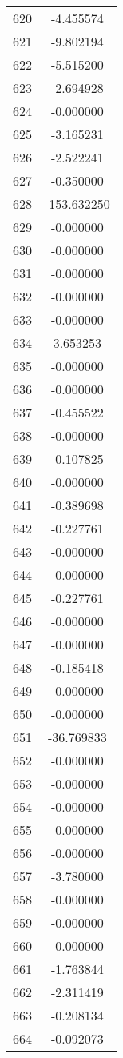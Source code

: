 \documentclass[12pt]{article}
\begin{document}
\begin{longtable}{@{}cc@{}}
620 & -4.455574 \\
621 & -9.802194 \\
622 & -5.515200 \\
623 & -2.694928 \\
624 & -0.000000 \\
625 & -3.165231 \\
626 & -2.522241 \\
627 & -0.350000 \\
628 & -153.632250 \\
629 & -0.000000 \\
630 & -0.000000 \\
631 & -0.000000 \\
632 & -0.000000 \\
633 & -0.000000 \\
634 & 3.653253 \\
635 & -0.000000 \\
636 & -0.000000 \\
637 & -0.455522 \\
638 & -0.000000 \\
639 & -0.107825 \\
640 & -0.000000 \\
641 & -0.389698 \\
642 & -0.227761 \\
643 & -0.000000 \\
644 & -0.000000 \\
645 & -0.227761 \\
646 & -0.000000 \\
647 & -0.000000 \\
648 & -0.185418 \\
649 & -0.000000 \\
650 & -0.000000 \\
651 & -36.769833 \\
652 & -0.000000 \\
653 & -0.000000 \\
654 & -0.000000 \\
655 & -0.000000 \\
656 & -0.000000 \\
657 & -3.780000 \\
658 & -0.000000 \\
659 & -0.000000 \\
660 & -0.000000 \\
661 & -1.763844 \\
662 & -2.311419 \\
663 & -0.208134 \\
664 & -0.092073 \\

\end{longtable}
\end{document}
